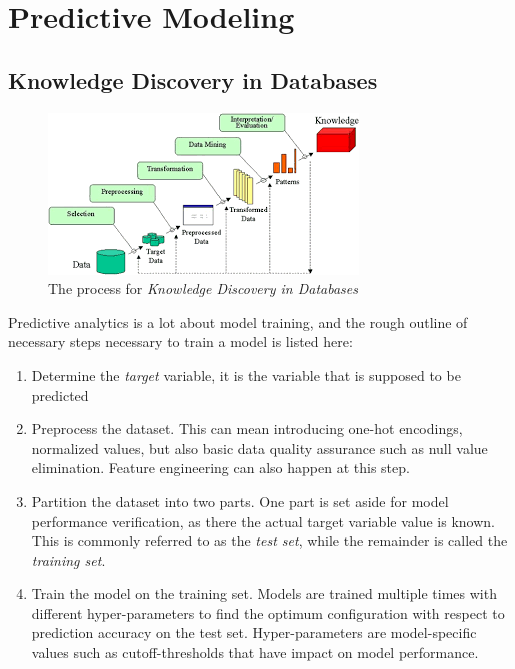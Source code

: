 \section{Predictive Modeling}
\subsection{Knowledge Discovery in Databases}
\begin{figure}
	\centering
	\includegraphics[width=\textwidth]{gfx/kdd_process}
	\caption{The process for \textit{Knowledge Discovery in Databases}}
	\label{fig:kdd_process}
\end{figure}
Predictive analytics is a lot about model training, and the rough outline of necessary steps necessary to train a model is listed here:
\begin{enumerate}
	\item Determine the \textit{target} variable, it is the variable that is supposed to be predicted
	\item Preprocess the dataset. This can mean introducing one-hot encodings, normalized values, but also basic data quality assurance such as null value elimination. Feature engineering can also happen at this step.
	\item Partition the dataset into two parts. One part is set aside for model performance verification, as there the actual target variable value is known. This is commonly referred to as the \textit{test set}, while the remainder is called the \textit{training set}.
	\item Train the model on the training set. Models are trained multiple times with different hyper-parameters to find the optimum configuration with respect to prediction accuracy on the test set. Hyper-parameters are model-specific values such as cutoff-thresholds that have impact on model performance.
\end{enumerate}

